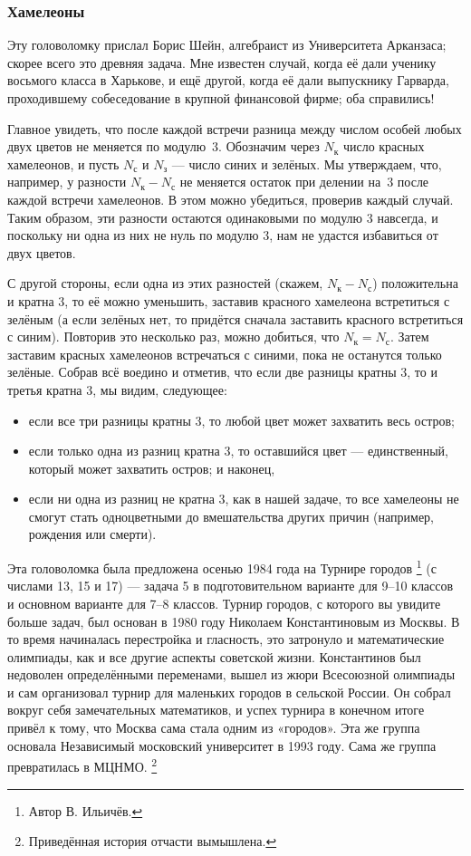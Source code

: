 \subsubsection*{Хамелеоны}

Эту головоломку прислал Борис Шейн, алгебраист из Университета Арканзаса; скорее всего это древняя задача.
Мне известен случай, когда её дали ученику восьмого класса в Харькове,
и ещё другой, когда её дали выпускнику Гарварда, проходившему собеседование в крупной финансовой фирме;
оба справились!

Главное увидеть, что после каждой встречи разница между числом особей любых двух цветов не меняется по модулю~3.
Обозначим через $N_{\text{к}}$ число красных хамелеонов, и пусть
$N_{\text{с}}$ и $N_{\text{з}}$ --- число синих и зелёных.
Мы утверждаем, что, например, у разности $N_{\text{к}} - N_{\text{с}}$ не меняется остаток при делении на~$3$ после каждой встречи хамелеонов.
В этом можно убедиться, проверив каждый случай.
Таким образом, эти разности остаются одинаковыми по модулю 3 навсегда, и поскольку ни одна из них не нуль по модулю 3, нам не удастся избавиться от двух цветов.

С другой стороны, если одна из этих разностей (скажем, $N_{\text{к}} - N_{\text{с}}$) положительна и кратна $3$, то её можно уменьшить, заставив красного хамелеона встретиться с зелёным (а если зелёных нет, то придётся сначала заставить красного встретиться с синим).
Повторив это несколько раз, можно добиться, что $N_{\text{к}} = N_{\text{с}}$.
Затем заставим красных хамелеонов встречаться с синими, пока не останутся только зелёные.
Собрав всё воедино и отметив, что если две разницы кратны $3$, то и третья кратна $3$, мы видим, следующее:
\begin{itemize}
\item если все три разницы кратны 3, то любой цвет может захватить весь остров;
\item если только одна из разниц кратна 3, то оставшийся цвет --- единственный, который может захватить остров; и наконец,
\item если ни одна из разниц не кратна 3, как в нашей задаче, то все хамелеоны не смогут стать одноцветными до вмешательства других причин (например, рождения или смерти).
\end{itemize}

Эта головоломка была предложена осенью 1984 года на Турнире городов%
\footnote{Автор В. Ильичёв.\pr} (с числами 13, 15 и 17) --- задача 5 в подготовительном варианте для 9--10 классов и основном варианте для 7--8 классов.
Турнир городов, с которого вы увидите больше задач, был основан в 1980 году Николаем Константиновым из Москвы.
В то время начиналась перестройка и гласность, это затронуло и математические олимпиады, как и все другие аспекты советской жизни.
Константинов был недоволен определёнными переменами, вышел из жюри Всесоюзной олимпиады и сам организовал турнир для маленьких городов в сельской России.
Он собрал вокруг себя замечательных математиков, и успех турнира в конечном итоге привёл к тому, что Москва сама стала одним из «городов».
Эта же группа основала Независимый московский университет в 1993 году.
Сама же группа превратилась в МЦНМО.%
\footnote{Приведённая история отчасти вымышлена.\pr}

